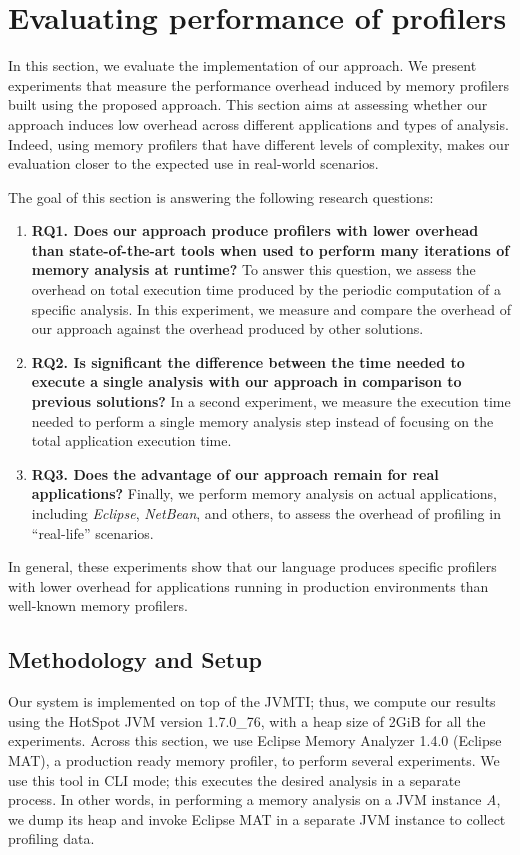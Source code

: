 \section{Evaluating performance of profilers}\label{sec:dsl-evaluation}

In this section, we evaluate the implementation of our approach.
We present experiments that measure the performance overhead induced by memory profilers built using the proposed approach.
This section aims at assessing whether our approach induces low overhead across different applications and types of analysis.
Indeed, using memory profilers that have different levels of complexity, makes our evaluation closer to the expected use in real-world scenarios.

The goal of this section is answering the following research questions:
\begin{enumerate}
\item \textbf{RQ1. Does our approach produce profilers with lower overhead than state-of-the-art tools when used to perform many iterations of memory analysis at runtime?} To answer this question, we assess the overhead on total execution time produced by the periodic computation of a specific analysis.
In this experiment, we measure and compare the overhead of our approach against the overhead produced by other solutions.
\item \textbf{RQ2. Is significant the difference between the time needed to execute a single analysis with our approach in comparison to previous solutions? }
In a second experiment, we measure the execution time needed to perform a single memory analysis step instead of focusing on the total application execution time.
\item \textbf{RQ3. Does the advantage of our approach remain for real applications? }
 Finally, we perform memory analysis on actual applications, including \textit{Eclipse}, \textit{NetBean}, and others, to assess the overhead of profiling in ``real-life'' scenarios. 
\end{enumerate}

In general, these experiments show that our language produces specific profilers with lower overhead for applications running in production environments than well-known memory profilers.

\subsection{Methodology and Setup}\label{sec:MethodologyAndSetup}
Our system is implemented on top of the JVMTI; thus, we compute our results using the HotSpot JVM version 1.7.0\_76, with a heap size of 2GiB for all the experiments.
Across this section, we use Eclipse Memory Analyzer 1.4.0 (Eclipse MAT), a production ready memory profiler, to perform several experiments.
We use this tool in \gls{CLI} mode; this executes the desired analysis in a separate process.
In other words, in performing a memory analysis on a JVM instance \textit{A}, we dump its heap and invoke Eclipse MAT in a separate JVM instance to collect profiling data.

